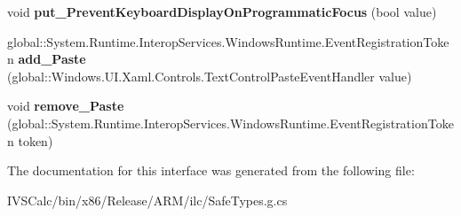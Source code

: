 \begin{DoxyCompactItemize}
void {\bfseries put\+\_\+\+Prevent\+Keyboard\+Display\+On\+Programmatic\+Focus} (bool value)
\item 
\mbox{\label{interface_windows_1_1_u_i_1_1_xaml_1_1_controls_1_1_i_text_box2_af0c1b156b0a6aa5c1695e2b35cee2f48}} 
global\+::\+System.\+Runtime.\+Interop\+Services.\+Windows\+Runtime.\+Event\+Registration\+Token {\bfseries add\+\_\+\+Paste} (global\+::\+Windows.\+U\+I.\+Xaml.\+Controls.\+Text\+Control\+Paste\+Event\+Handler value)
\item 
\mbox{\label{interface_windows_1_1_u_i_1_1_xaml_1_1_controls_1_1_i_text_box2_a269082d94ab6b91935799f8f5f0b945d}} 
void {\bfseries remove\+\_\+\+Paste} (global\+::\+System.\+Runtime.\+Interop\+Services.\+Windows\+Runtime.\+Event\+Registration\+Token token)
\end{DoxyCompactItemize}


The documentation for this interface was generated from the following file\+:\begin{DoxyCompactItemize}
\item 
I\+V\+S\+Calc/bin/x86/\+Release/\+A\+R\+M/ilc/Safe\+Types.\+g.\+cs\end{DoxyCompactItemize}
